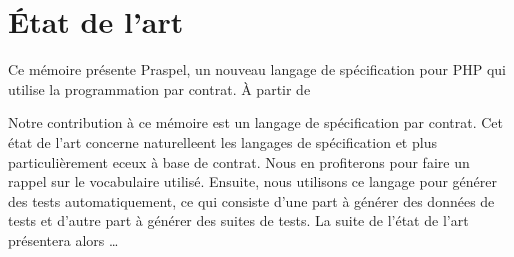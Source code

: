 \chapter{État de l'art}
\label{chapter:state}

\minitoc

Ce mémoire présente Praspel, un nouveau langage de spécification pour PHP qui
utilise la programmation par contrat. À partir de 



Notre contribution à ce mémoire est un langage de spécification par contrat.
Cet état de l'art concerne naturelleent les langages de spécification et plus
particulièrement eceux à base de contrat. Nous en profiterons pour faire un
rappel sur le vocabulaire utilisé. Ensuite, nous utilisons ce langage pour
générer des tests automatiquement, ce qui consiste d'une part à générer des
données de tests et d'autre part à générer des suites de tests. La suite de
l'état de l'art présentera alors …

